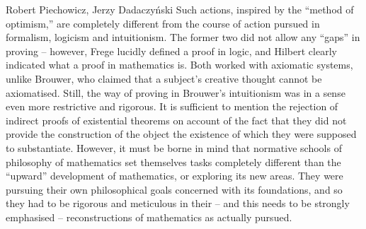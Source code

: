 \begin{artengenv}{Robert Piechowicz, Jerzy Dadaczyński}
Such actions, inspired by the ``method of optimism,'' are completely different from the course of action pursued in formalism, logicism and intuitionism. The former two did not allow any ``gaps'' in proving -- however, Frege lucidly defined a proof in logic, and Hilbert clearly indicated what a proof in mathematics is. Both worked with axiomatic systems, unlike Brouwer, who claimed that a subject's creative thought cannot be axiomatised. Still, the way of proving in Brouwer's intuitionism was in a sense even more restrictive and rigorous. It is sufficient to mention the rejection of indirect proofs of existential theorems on account of the fact that they did not provide the construction of the object the existence of which they were supposed to substantiate. However, it must be borne in mind that normative schools of philosophy of mathematics set themselves tasks completely different than the ``upward'' development of mathematics, or exploring its new areas. They were pursuing their own philosophical goals concerned with its foundations, and so they had to be rigorous and meticulous in their -- and this needs to be strongly emphasised -- reconstructions of mathematics as actually pursued.


\end{artengenv}
